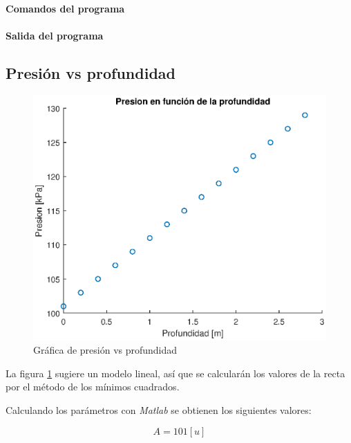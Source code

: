 \documentclass[letter,11pt]{article}
\begin{document}
\paragraph{Comandos del programa}
\begin{alltt}
\footnotesize

\normalsize
\end{alltt}

\paragraph{Salida del programa}
\begin{alltt}
\footnotesize

\normalsize
\end{alltt}

\newpage
\subsection{Presión vs profundidad}
\begin{figure}[!h]
\centering
\includegraphics[scale=1.00]{resources/3.2.1.eps}
\caption{Gráfica de presión vs profundidad}
\label{practica42}
\end{figure}

La figura \ref{practica42} sugiere un modelo lineal, así que se calcularán los
valores de la recta por el método de los mínimos cuadrados.

Calculando los parámetros con \emph{Matlab} se obtienen los siguientes valores:

\begin{equation}
    A = 101 [u]
\end{equation}
\end{document}
